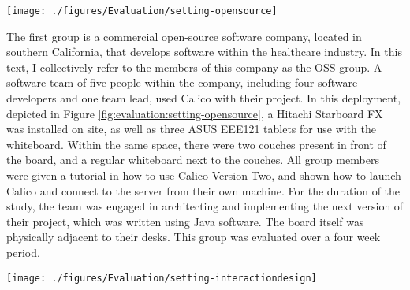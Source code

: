 \documentclass[12pt,fleqn]{ucithesis}
\providecommand{\DIFaddtex}[1]{{\protect\color{blue}\uwave{#1}}} %
\providecommand{\DIFdeltex}[1]{{\protect\color{red}\sout{#1}}}                      %
\providecommand{\DIFaddFL}[1]{\DIFadd{#1}} %
\providecommand{\DIFdelFL}[1]{\DIFdel{#1}} %
\providecommand{\DIFaddbeginFL}{} %
\providecommand{\DIFaddendFL}{} %
\providecommand{\DIFdelbeginFL}{} %
\providecommand{\DIFdelendFL}{} %
\providecommand{\DIFadd}[1]{\texorpdfstring{\DIFaddtex{#1}}{#1}} %
\providecommand{\DIFdel}[1]{\texorpdfstring{\DIFdeltex{#1}}{}} %
\begin{document}
\begin{figure*}[tbh]
  \centering
  \texttt{[image: ./figures/Evaluation/setting-opensource]}
  \caption{\DIFdelbeginFL \DIFdelFL{TODO: HAVE GERALD APPROVE IMAGE }\DIFdelendFL The physical setup \DIFdelbeginFL \DIFdelFL{of }\DIFdelendFL \DIFaddbeginFL \DIFaddFL{at }\DIFaddendFL the \DIFaddbeginFL \DIFaddFL{commercial }\DIFaddendFL OSS \DIFdelbeginFL \DIFdelFL{group}\DIFdelendFL \DIFaddbeginFL \DIFaddFL{company}\DIFaddendFL }
  \label{fig:evaluation:setting-opensource}
\end{figure*}

The first group is a commercial open-source software company, located in southern California, that develops software within the healthcare industry. In this text, I collectively refer to the members of this company as the OSS group. A software team of five people within the company, including four software developers and one team lead, used Calico with their project. In this deployment, depicted in Figure \ref{fig:evaluation:setting-opensource}, a Hitachi Starboard FX was installed on site, as well as three ASUS EEE121 tablets for use with the whiteboard. Within the same space, there were two couches present in front of the board, and a regular whiteboard next to the couches. All group members were given a tutorial in how to use Calico Version Two, and shown how to launch Calico and connect to the server from their own machine.  For the duration of the study, the team was engaged in architecting and implementing the next version of their project, which was written using Java software. The board itself was physically adjacent to their desks. This group was evaluated over a four week period.

\begin{figure*}[tbh]
  \centering
  \texttt{[image: ./figures/Evaluation/setting-interactiondesign]}
  \caption{TODO: HAVE JIM APPROVE IMAGE A tutorial of the usage of Calico given to the interaction design group}
  \label{fig:evaluation:setting-interactiondesign}
\end{figure*}
\end{document}

